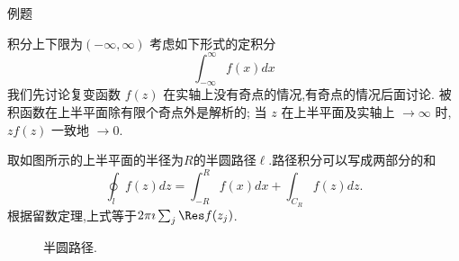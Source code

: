 \documentclass[fontset=windows, chinese, 10pt]{beamer}
\begin{document}
  

  \begin{frame}{例题}
    \small 

\end{frame}

\begin{frame}{积分上下限为$( -\infty, \infty)$}
  \small
  考虑如下形式的定积分
 \[
    \int_{-\infty}^{\infty} f(x) dx
 \]
 我们先讨论复变函数 $f(z)$ 在实轴上没有奇点的情况,有奇点的情况后面讨论. 
被积函数在上半平面除有限个奇点外是解析的; 当 $z$ 在上半平面及实轴上 $\to \infty$ 时, 
$z f(z)$ 一致地 $\to 0$.

取如图所示的上半平面的半径为$R$的半圆路径$\ell$.路径积分可以写成两部分的和
\begin{equation}
    \oint_l f(z) d z=\int_{-R}^R f(x) d x+\int_{C_R} f(z) d z .
\end{equation}
根据留数定理,上式等于$2\pi \imath  \sum_j \Res f(z_j)$.
%

\begin{figure}[htb!]
    \centering
    \scalebox{0.6}{}
    \caption{半圆路径.}
    \label{fig:semicircle}
\end{figure}
\end{frame}
\end{document}
